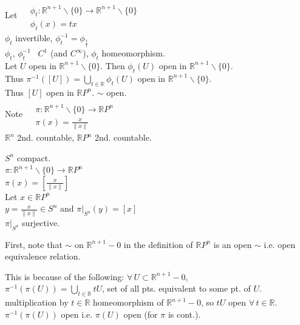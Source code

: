 Let $ \begin{aligned} & \quad \\ 
  & \phi_t : \mathbb{R}^{n+1}\backslash \lbrace  0 \rbrace \to \mathbb{R}^{n+1} \backslash \lbrace 0 \rbrace \\ 
  & \phi_t(x) = tx \end{aligned}$ \\
$\phi_t$ invertible, $\phi_t^{-1} = \phi_{\frac{1}{t}}$ \\
$\phi_t$, $\phi_t^{-1}$ \, $C^1$ (and $C^{\infty}$), $\phi_t$ homeomorphism.  \\

Let $U$ open in $\mathbb{R}^{n+1}\backslash \lbrace 0 \rbrace$.  Then $\phi_t(U)$ open in $\mathbb{R}^{n+1}\backslash \lbrace 0 \rbrace$.  \\
Thus $\pi^{-1}([U]) = \bigcup_{t \in \mathbb{R}} \phi_t(U)$ open in $\mathbb{R}^{n+1}\backslash \lbrace 0 \rbrace$.  \\
Thus $[U]$ open in $\mathbb{R}P^n$.  $\sim$ open.  \\

Note $\begin{aligned} & \quad  \\
  & \pi : \mathbb{R}^{n+1} \backslash \lbrace 0 \rbrace \to \mathbb{R}P^n \\
  & \pi(x) = \frac{x}{ \| x\| } \end{aligned}$ \\
$\mathbb{R}^n$ 2nd. countable, $\mathbb{R}P^n$ 2nd. countable.  



$S^n$ compact. \\
$\pi :\mathbb{R}^{n+1}\backslash \lbrace 0 \rbrace \to \mathbb{R}P^n$ \\
$\pi(x) = [ \frac{x}{ \| x \| } ]$ \\
Let $x \in \mathbb{R}P^n$ \\
\phantom{Let } $y = \frac{x}{ \| x \| } \in S^n$ and $ \left. \pi \right|_{S^n}(y) = [x]$ \\
$\left. \pi \right|_{S^n}$ surjective.  




First, note that $\sim $ on $\mathbb{R}^{n+1} -0$ in the definition of $\mathbb{R}P^n$ is an open $\sim$ i.e. open equivalence relation.  

This is because of the following:
$\forall \, U \subset \mathbb{R}^{n+1}-0$, \\
$\pi^{-1}(\pi(U)) = \bigcup_{t\in \mathbb{R}} tU$, set of all pts. equivalent to some pt. of $U$.  \\
multiplication by $t\in \mathbb{R}$ homeomorphism of $\mathbb{R}^{n+1} - 0$, so $tU$ open $\forall \, t \in \mathbb{R}$.  \\
$\pi^{-1}(\pi(U))$ open i.e. $\pi(U)$ open (for $\pi$ is cont.).  



